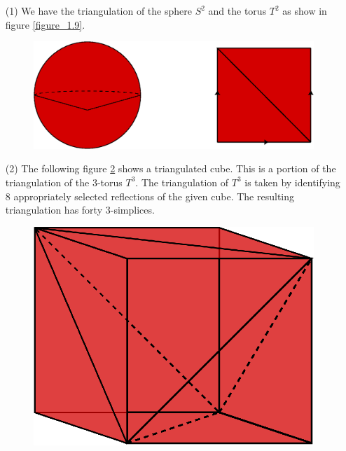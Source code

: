 \begin{example}\label{example_1.14}
    \begin{enumerate}
        \item[(1)] We have the triangulation of the sphere $S^2$ and the torus
            $T^2$ as show in figure \ref{figure_1.9}.
            \begin{figure}[h]
                \centering
                \includegraphics[scale=0.5]{Figures/chapter1/trangulations_S^2_T^2.eps}
                \caption{}
                \label{figure_1.10}
            \end{figure}

        \item[(2)] The following figure \ref{figure_1.11} shows a triangulated
            cube. This is a portion of the triangulation of the $3$-torus
            $T^3$. The triangulation of  $T^3$ is taken by identifying  $8$
            appropriately selected reflections of the given cube. The resulting
            triangulation has forty $3$-simplices.
            \begin{figure}[h]
                \centering
                \includegraphics[scale=0.5]{Figures/chapter1/trangulation_T^3.eps}
                \caption{}
                \label{figure_1.11}
            \end{figure}
    \end{enumerate}
\end{example}

